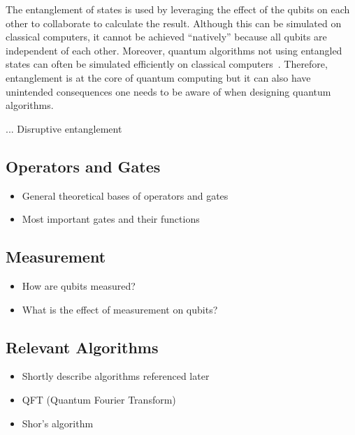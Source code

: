 The entanglement of states is used by leveraging the effect of the qubits on each other to collaborate to calculate the result. Although this can be simulated on classical computers, it cannot be achieved ``natively'' because all qubits are independent of each other. Moreover, quantum algorithms not using entangled states can often be simulated efficiently on classical computers~\cite{MHH19}. Therefore, entanglement is at the core of quantum computing but it can also have unintended consequences one needs to be aware of when designing quantum algorithms.

... Disruptive entanglement

\subsection{Operators and Gates}
\begin{itemize}
    \item General theoretical bases of operators and gates
    \item Most important gates and their functions
\end{itemize}

\subsection{Measurement}
\begin{itemize}
    \item How are qubits measured?
    \item What is the effect of measurement on qubits?
\end{itemize}

\subsection{Relevant Algorithms}
\begin{itemize}
    \item Shortly describe algorithms referenced later
    \item QFT (Quantum Fourier Transform) 
    \item Shor's algorithm 
\end{itemize}